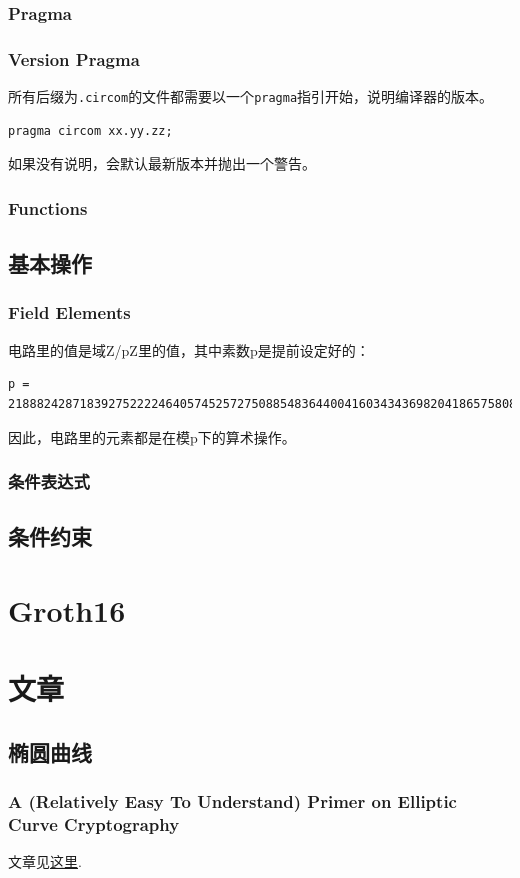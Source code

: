 \documentclass[10pt]{ctexart}
\begin{document}
\subsubsection{Pragma}
\subsubsection*{Version Pragma}
所有后缀为\verb|.circom|的文件都需要以一个\verb|pragma|指引开始，说明编译器的版本。
\begin{lstlisting}
pragma circom xx.yy.zz;
\end{lstlisting}
如果没有说明，会默认最新版本并抛出一个警告。
\subsubsection{Functions}
\subsection{基本操作}
\subsubsection{Field Elements}
电路里的值是域Z/pZ里的值，其中素数p是提前设定好的：
\begin{lstlisting}
p = 21888242871839275222246405745257275088548364400416034343698204186575808495617.
\end{lstlisting}
因此，电路里的元素都是在模p下的算术操作。
\subsubsection{条件表达式}

\subsection{条件约束}

\section{Groth16}
\section{文章}
\subsection{椭圆曲线}
\subsubsection{A (Relatively Easy To Understand) Primer on Elliptic Curve Cryptography}
文章见\href{https://blog.cloudflare.com/a-relatively-easy-to-understand-primer-on-elliptic-curve-cryptography/}{这里}.
\end{document}
